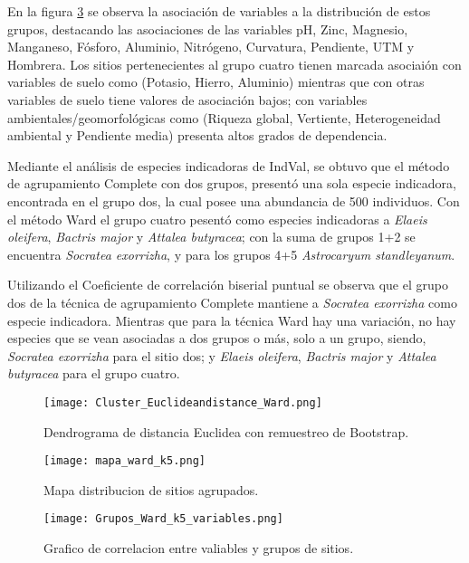 \documentclass[11pt,]{article}
\begin{document}
En la figura \ref{fig:Grupos_Ward_k5_variables} se observa la asociación
de variables a la distribución de estos grupos, destacando las
asociaciones de las variables pH, Zinc, Magnesio, Manganeso, Fósforo,
Aluminio, Nitrógeno, Curvatura, Pendiente, UTM y Hombrera. Los sitios
pertenecientes al grupo cuatro tienen marcada asociaión con variables de
suelo como (Potasio, Hierro, Aluminio) mientras que con otras variables
de suelo tiene valores de asociación bajos; con variables
ambientales/geomorfológicas como (Riqueza global, Vertiente,
Heterogeneidad ambiental y Pendiente media) presenta altos grados de
dependencia.

Mediante el análisis de especies indicadoras de IndVal, se obtuvo que el
método de agrupamiento Complete con dos grupos, presentó una sola
especie indicadora, encontrada en el grupo dos, la cual posee una
abundancia de 500 individuos. Con el método Ward el grupo cuatro pesentó
como especies indicadoras a \emph{Elaeis oleifera}, \emph{Bactris major}
y \emph{Attalea butyracea}; con la suma de grupos 1+2 se encuentra
\emph{Socratea exorrizha}, y para los grupos 4+5 \emph{Astrocaryum
standleyanum}.

Utilizando el Coeficiente de correlación biserial puntual se observa que
el grupo dos de la técnica de agrupamiento Complete mantiene a
\emph{Socratea exorrizha} como especie indicadora. Mientras que para la
técnica Ward hay una variación, no hay especies que se vean asociadas a
dos grupos o más, solo a un grupo, siendo, \emph{Socratea exorrizha}
para el sitio dos; y \emph{Elaeis oleifera}, \emph{Bactris major} y
\emph{Attalea butyracea} para el grupo cuatro.

\begin{figure}
\centering
\texttt{[image: Cluster\_Euclideandistance\_Ward.png]}
\caption{Dendrograma de distancia Euclidea con remuestreo de Bootstrap.
\label{fig:Cluster_Euclideandistance_Ward}}
\end{figure}

\begin{figure}
\centering
\texttt{[image: mapa\_ward\_k5.png]}
\caption{Mapa distribucion de sitios agrupados.
\label{fig:mapa_ward_k5}}
\end{figure}

\begin{figure}
\centering
\texttt{[image: Grupos\_Ward\_k5\_variables.png]}
\caption{Grafico de correlacion entre valiables y grupos de sitios.
\label{fig:Grupos_Ward_k5_variables}}
\end{figure}
\end{document}
